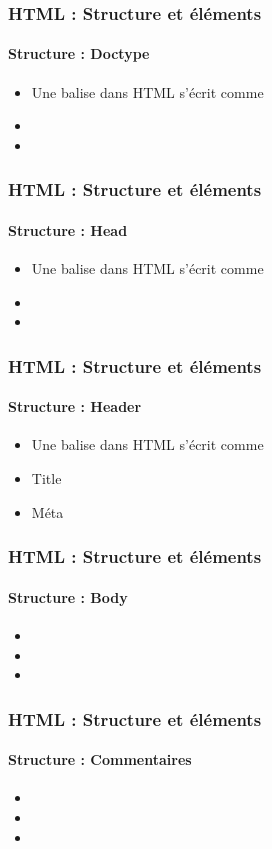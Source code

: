 \documentclass[xcolor=table]{beamer}
\begin{document}
\begin{frame}
\frametitle{HTML : Structure et éléments}
\framesubtitle{Structure : Doctype}

\begin{itemize}
	\item Une balise dans HTML s'écrit comme 
	\item   
	\item 
\end{itemize}

\end{frame}

\begin{frame}
\frametitle{HTML : Structure et éléments}
\framesubtitle{Structure : Head}

\begin{itemize}
	\item Une balise dans HTML s'écrit comme 
	\item   
	\item 
\end{itemize}

\end{frame}

\begin{frame}
\frametitle{HTML : Structure et éléments}
\framesubtitle{Structure : Header}

\begin{itemize}
	\item Une balise dans HTML s'écrit comme 
	\item Title
	\item Méta
\end{itemize}

\end{frame}

\begin{frame}
\frametitle{HTML : Structure et éléments}
\framesubtitle{Structure : Body}

\begin{itemize}
	\item  
	\item 
	\item 
\end{itemize}

\end{frame}

\begin{frame}
\frametitle{HTML : Structure et éléments}
\framesubtitle{Structure : Commentaires}

\begin{itemize}
	\item  
	\item 
	\item 
\end{itemize}

\end{frame}
\end{document}
